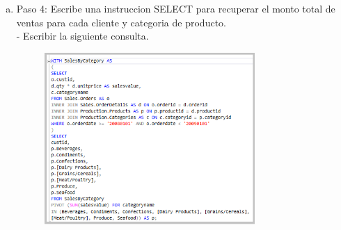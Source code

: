\begin{enumerate}[1.]
\begin{enumerate}[a)]
\begin{figure}[H]
\begin{center}
		\end{center}
		\end{figure}
	\item Paso 4: Escribe una instruccion SELECT para recuperar el monto total de ventas para cada cliente y categoria de producto.\\
		-  Escribir la siguiente consulta. 
		\begin{figure}[H]
		\begin{center}
		\includegraphics[width=8cm]{./Imagenes/3-2}
		\end{center}
		\end{figure}
	\end{enumerate}


\end{enumerate}
